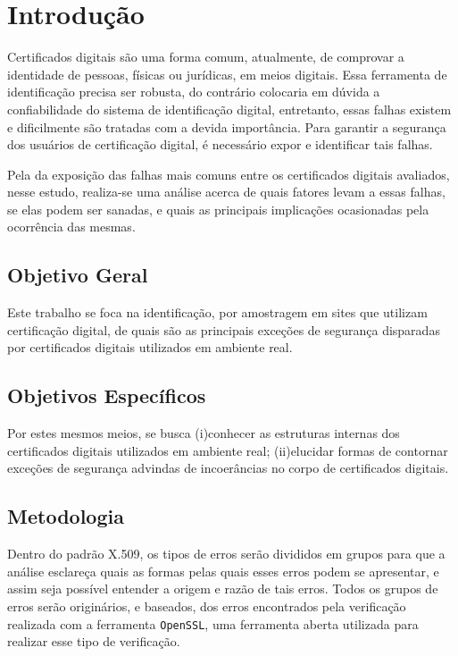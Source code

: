 
\chapter[Introdução]{Introdução}
	Certificados digitais são uma forma comum, atualmente, de comprovar a identidade de pessoas, físicas ou jurídicas, em meios digitais. Essa ferramenta de identificação precisa ser robusta, do contrário colocaria em dúvida a confiabilidade do sistema de identificação digital, entretanto, essas falhas existem e dificilmente são tratadas com a devida importância. Para garantir a segurança dos usuários de certificação digital, é necessário expor e identificar tais falhas.

	Pela da exposição das falhas mais comuns entre os certificados digitais avaliados, nesse estudo, realiza-se uma análise acerca de quais fatores levam a essas falhas, se elas podem ser sanadas, e quais as principais implicações ocasionadas pela ocorrência das mesmas.

\section[Objetivo Geral]{Objetivo Geral}

	Este trabalho se foca na identificação, por amostragem em sites que utilizam certificação digital, de quais são as principais exceções de segurança disparadas por certificados digitais utilizados em ambiente real.

\section[Objetivos Específicos]{Objetivos Específicos}

	Por estes mesmos meios, se busca (i)conhecer as estruturas internas dos certificados digitais utilizados em ambiente real; (ii)elucidar formas de contornar exceções de segurança advindas de incoerâncias no corpo de certificados digitais.

\section[Metodologia]{Metodologia}
	
	Dentro do padrão X.509, os tipos de erros serão divididos em grupos para que a análise esclareça quais as formas pelas quais esses erros podem se apresentar, e assim seja possível entender a origem e razão de tais erros. Todos os grupos de erros serão originários, e baseados, dos erros encontrados pela verificação realizada com a ferramenta \texttt{OpenSSL}, uma ferramenta aberta utilizada para realizar esse tipo de verificação.

